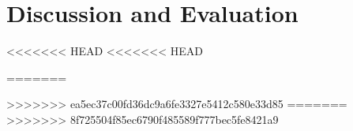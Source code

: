 \section{Discussion and Evaluation}
	
	
	
	
<<<<<<< HEAD
<<<<<<< HEAD
    
	

=======
	
	
>>>>>>> ea5ec37c00fd36dc9a6fe3327e5412c580e33d85
=======
>>>>>>> 8f725504f85ec6790f485589f777bec5fe8421a9
